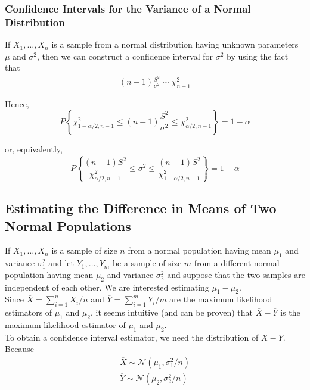\documentclass[12pt]{article}
\begin{document}
\subsubsection{Confidence Intervals for the Variance of a Normal Distribution}

If $X_1, \dots, X_n$ is a sample from a normal distribution having unknown parameters $\mu$ and $\sigma^2$, then we can construct a confidence interval for $\sigma^2$ by using the fact that
\begin{eqnarray*}
  (n-1) \frac {S^2}{\sigma^2} \sim \chi^2_{n-1}
\end{eqnarray*}

Hence,
\begin{equation*}
  P \left\{ \chi_{1-\alpha / 2, n-1}^2 \le (n-1) \frac {S^2}{\sigma^2}
    \le \chi_{\alpha / 2, n-1}^2 \right\} = 1 - \alpha
\end{equation*}

or, equivalently,
\begin{equation*}
  P \left\{ \frac {(n-1)S^2} {\chi_{\alpha / 2, n-1}^2}
    \le \sigma^2
    \le \frac {(n-1)S^2} {\chi_{1 - \alpha / 2, n-1}^2} \right\}
  = 1 - \alpha
\end{equation*}

\subsection{Estimating the Difference in Means of Two Normal Populations}

If $X_1, \dots, X_n$ is a sample of size $n$ from a normal population having mean $\mu_1$ and variance $\sigma_1^2$ and let $Y_1, \dots, Y_m$ be a sample of size $m$ from a different normal population having mean $\mu_2$ and variance $\sigma_2^2$ and suppose that the two samples are independent of each other. We are interested estimating $\mu_1 - \mu_2$. \\

Since $\overline{X} = \sum_{i=1}^n X_i / n$ and $\overline{Y} = \sum_{i=1}^m Y_i / m$ are the maximum likelihood estimators of $\mu_1$ and $\mu_2$, it seems intuitive (and can be proven) that $\overline{X} - \overline{Y}$ is the maximum likelihood estimator of $\mu_1$ and $\mu_2$. \\

To obtain a confidence interval estimator, we need the distribution of $\overline{X} - \overline{Y}$. Because
\begin{eqnarray*}
  \overline{X} \sim \mathcal{N} (\mu_1, \sigma_1^2 / n) \\
  \overline{Y} \sim \mathcal{N} (\mu_2, \sigma_2^2 / n)
\end{eqnarray*}
\end{document}
